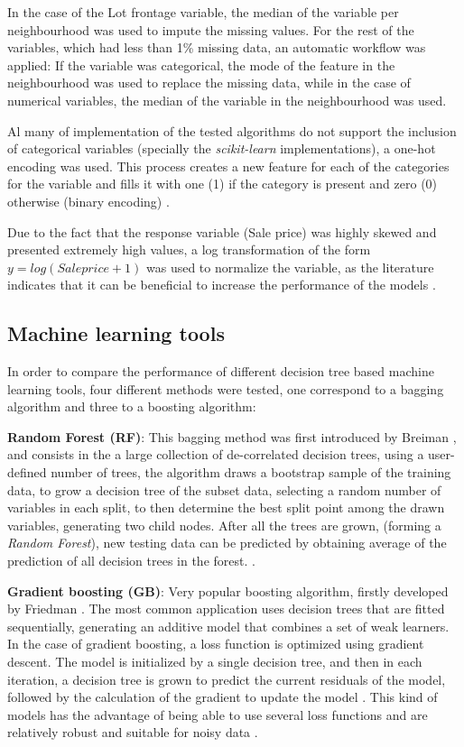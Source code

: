 \documentclass[11pt,onecolumn,titlepage,letterpaper]{article}
\begin{document}
In the case of the Lot frontage variable, the median of the variable per neighbourhood was used to impute the missing values. For the rest of the variables, which had less than 1\% missing data, an automatic workflow was applied: If the variable was categorical, the mode of the feature in the neighbourhood was used to replace the missing data, while in the case of numerical variables, the median of the variable in the neighbourhood was used.

Al many of implementation of the tested algorithms do not support the inclusion of categorical variables (specially the \textit{scikit-learn} implementations), a one-hot encoding was used. This process creates a new feature for each of the categories for the variable and fills it with one (1) if the category is present and zero (0) otherwise (binary encoding) \cite{Mittag2015}.  

Due to the fact that the response variable (Sale price) was highly skewed and presented extremely high values, a log transformation of the form $y = log(Saleprice + 1)$ was used to normalize the variable, as the literature indicates that it can be beneficial to increase the performance of the models \cite{Dettling2003,  Stevens2015}.

\subsection{Machine learning tools}

In order to compare the performance of different decision tree based machine learning tools, four different methods were tested, one correspond to a bagging algorithm and three to a boosting algorithm:

\textbf{Random Forest (RF)}: This bagging method was first introduced by Breiman \cite{Breiman2001b}, and consists in the a large collection of de-correlated decision trees, using a user-defined number of trees, the algorithm draws a bootstrap sample of the training data, to grow a decision tree of the subset data, selecting a random number of variables in each split, to then determine the best split point among the drawn variables, generating two child nodes. After all the trees are grown, (forming a \emph{Random Forest}), new testing data can be predicted by obtaining average of the prediction of all decision trees in the forest. \cite{Hastie2009}.

\textbf{Gradient boosting (GB)}: Very popular boosting algorithm, firstly developed by Friedman \cite{Friedman2001}. The most common application uses decision trees that are fitted sequentially, generating an additive model that combines a set of weak learners. In the case of gradient boosting, a loss function is optimized using gradient descent. The model is initialized by a single decision tree, and then in each iteration, a decision tree is grown to predict the current residuals of the model, followed by the calculation of the gradient to update the model \cite{Friedman2001, Elith2008}. This kind of models has the advantage of being able to use several loss functions \cite{Hastie2009} and are relatively robust and suitable for noisy data \cite{Friedman2001}.
\end{document}
